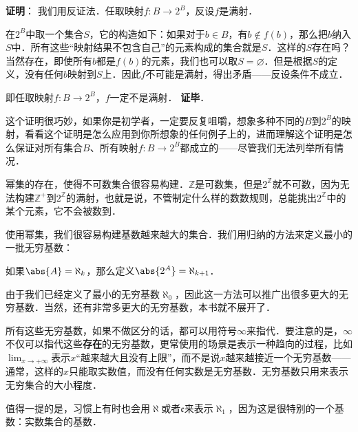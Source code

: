 \textbf{证明}：
我们用反证法．任取映射$f:B\rightarrow 2^B$，反设$f$是满射．

在$2^B$中取一个集合$S$，它的构造如下：如果对于$b\in B$，有$b\not\in f(b)$，那么把$b$纳入$S$中．所有这些“映射结果不包含自己”的元素构成的集合就是$S$．这样的$S$存在吗？当然存在，即使所有$b$都是$f(b)$的元素，我们也可以取$S=\varnothing$．但是根据$S$的定义，没有任何$b$映射到$S$上．因此$f$不可能是满射，得出矛盾——反设条件不成立．

即任取映射$f:B\rightarrow 2^B$，$f$一定不是满射．
\textbf{证毕}．

这个证明很巧妙，如果你是初学者，一定要反复咀嚼，想象多种不同的$B$到$2^B$的映射，看看这个证明是怎么应用到你所想象的任何例子上的，进而理解这个证明是怎么保证对所有集合$B$、所有映射$f:B\rightarrow 2^B$都成立的——尽管我们无法列举所有情况．

幂集的存在，使得不可数集合很容易构建．$\mathbb{Z}$是可数集，但是$2^{\mathbb{Z}}$就不可数，因为无法构建$\mathbb{Z}^+$到$2^{\mathbb{Z}}$的满射，也就是说，不管制定什么样的数数规则，总能挑出$2^{\mathbb{Z}}$中的某个元素，它不会被数到．

使用幂集，我们很容易构建基数越来越大的集合．我们用归纳的方法来定义最小的一批无穷基数：
\begin{definition}
如果$\abs{A}=\aleph_k$，那么定义$\abs{2^A}=\aleph_{k+1}$．
\end{definition}
由于我们已经定义了最小的无穷基数$\aleph_0$，因此这一方法可以推广出很多更大的无穷基数．当然，还有非常多更大的无穷基数，本书就不展开了．

所有这些无穷基数，如果不做区分的话，都可以用符号$\infty$来指代．要注意的是，$\infty$不仅可以指代这些\textbf{存在}的无穷基数，更常使用的场景是表示一种趋向的过程，比如$\lim_{x\rightarrow +\infty}$表示$x$“越来越大且没有上限”，而不是说$x$越来越接近一个无穷基数——通常，这样的$x$只能取实数值，而没有任何实数是无穷基数．无穷基数只用来表示无穷集合的大小程度．

值得一提的是，习惯上有时也会用$\aleph$或者$\mathfrak{c}$来表示$\aleph_1$，因为这是很特别的一个基数：实数集合的基数．
















